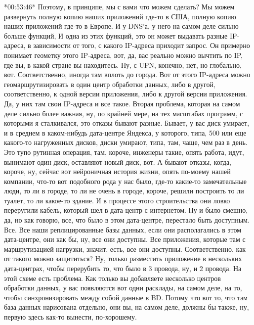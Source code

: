 \documentclass[12pt]{article} %
\begin{document}
*00:53:46*
Поэтому, в принципе, мы с вами что можем сделать?  Мы можем развернуть полную копию наших приложений где-то в США, полную копию наших приложений где-то в Европе.  И у DNS'а, у него на самом деле сильно больше функций, И одна из этих функций, это он может выдавать разные IP-адреса, в зависимости от того, с какого IP-адреса приходит запрос.  Он примерно понимает геометку этого IP-адреса, вот, да, вас реально можно вычтить по IP, где вы, в какой стране вы находитесь.  Ну, с UPN, конечно, нет, но глобально, вот.  Соответственно, иногда там вплоть до города.  Вот от этого IP-адреса можно геомаршрутизировать в один центр обработки данных, либо в другой, соответственно, к одной версии приложения, либо к другой версии приложения.  Да, у них там свои IP-адреса и все такое.  Вторая проблема, которая на самом деле сильно более важная, ну, по крайней мере, на тех масштабах программ, с которыми я сталкивался, это отказы бывают разные.  Бывает, у вас диск умирает, и в среднем в каком-нибудь дата-центре Яндекса, у которого, типа, 500 или еще какого-то нагруженных дисков, диски умирают, типа, там, чаще, чем раз в день.  Это тупо рутинная операция, там, короче, инженеры такие, опять работа, идут, вынимают один диск, оставляют новый диск, вот.  А бывают отказы, когда, короче, ну, сейчас вот нейроничная история жизни, опять по-моему нашей компании, что-то вот подобного рода у нас было, где-то какие-то замечательные люди, то ли в городе, то ли не очень в городе, короче, решили построить то ли туалет, то ли какое-то здание. И в процессе этого строительства они ловко переругили кабель, который шел в дата-центр с интернетом. Ну и было смешно, да, но как говорю, все, что было в этом дата-центре, перестало быть доступным. Все. Все наши реплицированные базы данных, если они располагались в этом дата-центре, они как бы, ну, все они доступны.  Все приложения, которые там с маршрутизацией нагрузки, значит, есть, все они доступны.  Соответственно, как от такого можно защититься?  Ну, только разместить приложение в нескольких дата-центрах, чтобы перерубить то, что было в 3 провода, ну, и 2 провода.  На этой схеме есть проблема.  Как только вы добавляете несколько центров обработки данных, у вас появляются вот одни расклады, на самом деле, на то, чтобы синхронизировать между собой данные в BD.  Потому что вот то, что там база данных нарисована отдельно, они вы, на самом деле, должны бы также, ну, первую здесь как-то вынести, по-хорошему.
\end{document}
